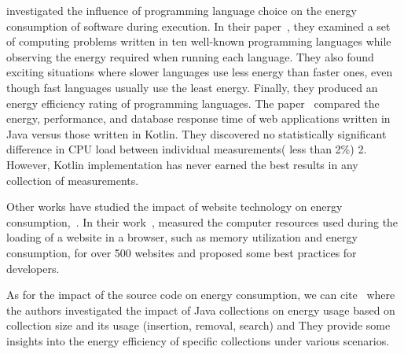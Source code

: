 \citeauthor{couto2017towards} investigated the influence of programming language choice on the energy consumption of software during execution. In their paper~\cite{couto2017towards}, they examined a set of computing problems written in ten well-known programming languages while observing the energy required when running each language. They also found exciting situations where slower languages use less energy than faster ones, even though fast languages usually use the least energy.
Finally, they produced an energy efficiency rating of programming languages.
The paper~\cite{bujnowski2020java} compared the energy, performance, and database response time of web applications written in Java versus those written in Kotlin. They discovered no statistically significant difference in CPU load between individual measurements( less than 2\%) 2. However, Kotlin implementation has never earned the best results in any collection of measurements.

Other works have studied the impact of website technology on energy consumption,~\cite{philippot_characterization_2014,manotas_investigating_2013}. In their work~\cite{philippot_characterization_2014},\citeauthor{philippot_characterization_2014} measured the computer resources used during the loading of a website in a browser, such as memory utilization and energy consumption, for over 500 websites and proposed some best practices for developers.


As for the impact of the source code on energy consumption, we can cite~\cite{pinto_comprehensive_2016,fernandes_assisting_2017} where the authors investigated the impact of Java collections on energy usage based on collection size and its usage (insertion, removal, search) and They provide some insights into the energy efficiency of specific collections under various scenarios.


